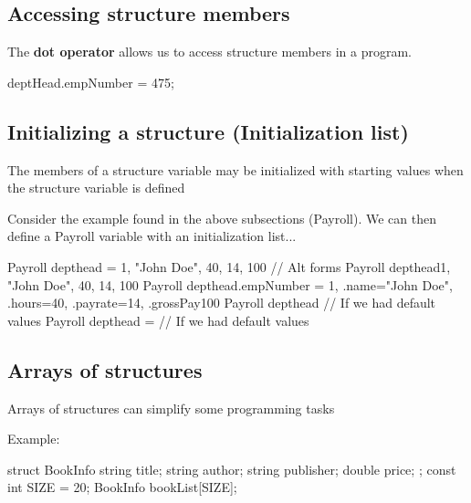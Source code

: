 \documentclass{report}
\begin{document}
	\bigbreak \noindent 
	\subsection{Accessing structure members}
	\bigbreak \noindent 
	\begin{concept}
	    The \textbf{dot operator} allows us to access structure members in a program.
	\end{concept}
	\bigbreak \noindent 
	
	\begin{cppcode}
deptHead.empNumber = 475;
	\end{cppcode}
	

	\bigbreak \noindent 
	\subsection{Initializing a structure (Initialization list)}
	\bigbreak \noindent 
	\begin{concept}
	   The members of a structure variable may be initialized with starting values when the structure variable is defined 
	\end{concept}
	\bigbreak \noindent 
	Consider the example found in the above subsections (Payroll). We can then define a Payroll variable with an initialization list...
	\bigbreak \noindent 
	
	\begin{cppcode}
Payroll depthead = {1, "John Doe", 40, 14, 100}
// Alt forms
Payroll depthead{1, "John Doe", 40, 14, 100} 
Payroll depthead{.empNumber = 1, .name="John Doe", .hours=40, .payrate=14, .grossPay100}
Payroll depthead{} // If we had default values
Payroll depthead = {} // If we had default values
	\end{cppcode}
	

	\pagebreak \bigbreak \noindent 
	\subsection{Arrays of structures}
	\bigbreak \noindent 
	\begin{concept}
	   Arrays of structures can simplify some programming tasks 
	\end{concept}
	\bigbreak \noindent 
	Example:
	\bigbreak \noindent 
	
	\begin{cppcode}
struct BookInfo {
    string title;
    string author;
    string publisher;
    double price;
};
const int SIZE = 20;
BookInfo bookList[SIZE];
	\end{cppcode}
	
\end{document}
